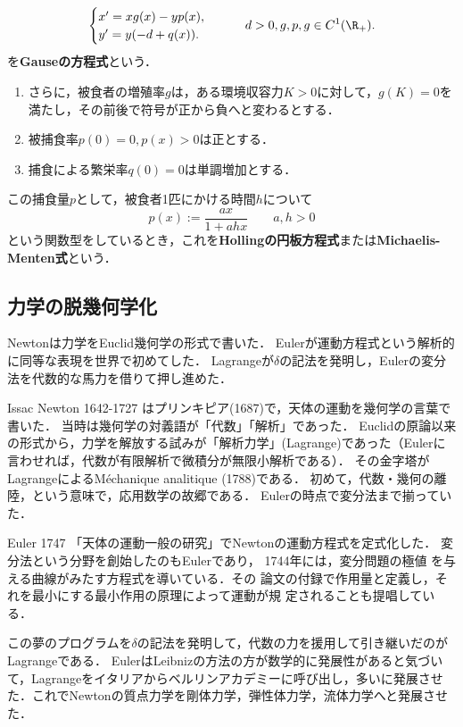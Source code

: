 \documentclass[uplatex,dvipdfmx]{jsreport}
\begin{document}
\begin{model}
    \[\begin{cases}
        x'=xg(x)-yp(x),\\
        y'=y(-d+q(x)).
    \end{cases}\qquad d>0,g,p,g\in C^1(\R_+).\]
    を\textbf{Gauseの方程式}という．
    \begin{enumerate}
        \item さらに，被食者の増殖率$g$は，ある環境収容力$K>0$に対して，$g(K)=0$を満たし，その前後で符号が正から負へと変わるとする．
        \item 被捕食率$p(0)=0,p(x)>0$は正とする．
        \item 捕食による繁栄率$q(0)=0$は単調増加とする．
    \end{enumerate}
    この捕食量$p$として，被食者1匹にかける時間$h$について
    \[p(x):=\frac{ax}{1+ahx}\qquad a,h>0\]
    という関数型をしているとき，これを\textbf{Hollingの円板方程式}または\textbf{Michaelis-Menten式}という．
\end{model}

\subsection{力学の脱幾何学化}

\begin{tcolorbox}[colframe=ForestGreen, colback=ForestGreen!10!white,breakable,colbacktitle=ForestGreen!40!white,coltitle=black,fonttitle=\bfseries\sffamily,
title=]
    Newtonは力学をEuclid幾何学の形式で書いた．
    Eulerが運動方程式という解析的に同等な表現を世界で初めてした．
    Lagrangeが$\delta$の記法を発明し，Eulerの変分法を代数的な馬力を借りて押し進めた．
\end{tcolorbox}

\begin{history}[幾何学の時代]
    Issac Newton 1642-1727 はプリンキピア(1687)で，天体の運動を幾何学の言葉で書いた．
    当時は幾何学の対義語が「代数」「解析」であった．
    Euclidの原論以来の形式から，力学を解放する試みが「解析力学」(Lagrange)であった（Eulerに言わせれば，代数が有限解析で微積分が無限小解析である）．
    その金字塔がLagrangeによるMéchanique analitique (1788)である．
    初めて，代数・幾何の離陸，という意味で，応用数学の故郷である．
    Eulerの時点で変分法まで揃っていた．
\end{history}

\begin{history}
    Euler 1747 \cite{Euler1747}「天体の運動一般の研究」でNewtonの運動方程式を定式化した．
    変分法という分野を創始したのもEulerであり，
    1744年には，変分問題の極値
    を与える曲線がみたす方程式を導いている．その
    論文の付録で作用量と定義し，そ
    れを最小にする最小作用の原理によって運動が規
    定されることも提唱している．

    この夢のプログラムを$\delta$の記法を発明して，代数の力を援用して引き継いだのがLagrangeである．
    EulerはLeibnizの方法の方が数学的に発展性があると気づいて，Lagrangeをイタリアからベルリンアカデミーに呼び出し，多いに発展させた．これでNewtonの質点力学を剛体力学，弾性体力学，流体力学へと発展させた．
\end{history}
\end{document}
